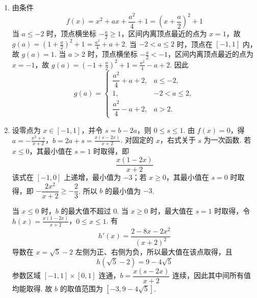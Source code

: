 \begin{solution}
\begin{enumerate}
\item 由条件
\[
f(x)=x^2+ax+\frac{a^2}{4}+1=\left(x+\frac a2\right)^2+1
\]
当 \(a\leqslant-2\) 时，顶点横坐标 \(-\frac a2\geqslant1\)，区间内离顶点最近的点为 \(x=1\)，故 \(g(a)=\left(1+\frac a2\right)^2+1=\frac{a^2}{4}+a+2\). 当 \(-2<a\leqslant2\) 时，顶点在 \([-1,1]\) 内，故 \(g(a)=1\). 当 \(a>2\) 时，顶点横坐标 \(-\frac a2<-1\)，区间内离顶点最近的点为 \(x=-1\)，故 \(g(a)=\left(-1+\frac a2\right)^2+1=\frac{a^2}{4}-a+2\). 因此
\[
g(a)=\begin{cases}
\dfrac{a^2}{4}+a+2,&a\leqslant-2,\\
1,&-2<a\leqslant2,\\
\dfrac{a^2}{4}-a+2,&a>2.
\end{cases}
\]

\item 设零点为 \(x\in[-1,1]\)，并令 \(s=b-2a\)，则 \(0\leqslant s\leqslant1\). 由 \(f(x)=0\)，得
\(a=-\frac{x^2+s}{x+2}\)，\(b=2a+s=\frac{x(s-2x)}{x+2}\).
对固定的 \(x\)，右式关于 \(s\) 为一次函数. 若 \(x\leqslant0\)，其最小值在 \(s=1\) 时取得，即
\[
\frac{x(1-2x)}{x+2}
\]
该式在 \([-1,0]\) 上递增，最小值为 \(-3\)；若 \(x\geqslant0\)，其最小值在 \(s=0\) 时取得，即 \(-\dfrac{2x^2}{x+2}\geqslant-\dfrac23\). 所以 \(b\) 的最小值为 \(-3\).

当 \(x\leqslant0\) 时，\(b\) 的最大值不超过 \(0\). 当 \(x\geqslant0\) 时，最大值在 \(s=1\) 时取得，令
\(h(x)=\frac{x(1-2x)}{x+2}\)，\(0\leqslant x\leqslant1\).
有
\[
h'(x)=\frac{2-8x-2x^2}{(x+2)^2}
\]
导数在 \(x=\sqrt5-2\) 左侧为正、右侧为负，所以最大值在该点取得，且
\[
h(\sqrt5-2)=9-4\sqrt5
\]
参数区域 \([-1,1]\times[0,1]\) 连通，\(b=\dfrac{x(s-2x)}{x+2}\) 连续，因此其中间所有值均能取得. 故 \(b\) 的取值范围为 \([-3,9-4\sqrt5]\).
\end{enumerate}
\end{solution}

